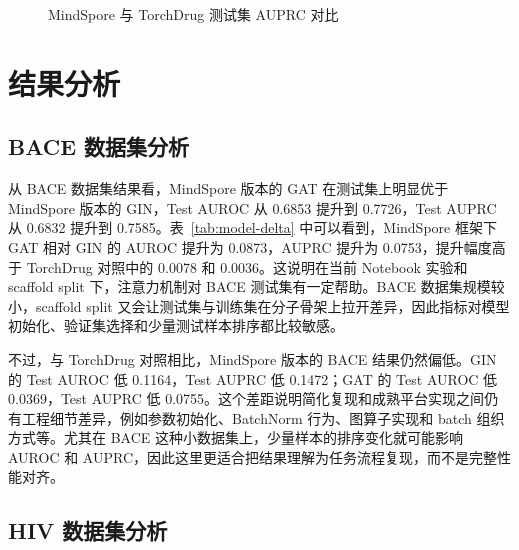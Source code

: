 \documentclass[12pt,hyperref,a4paper,UTF8]{ctexart}
\begin{document}
\begin{figure}[H]
  \centering
  \caption{MindSpore 与 TorchDrug 测试集 AUPRC 对比}
  \label{fig:auprc}
\end{figure}

\section{结果分析}

\subsection{BACE 数据集分析}

从 BACE 数据集结果看，MindSpore 版本的 GAT 在测试集上明显优于 MindSpore 版本的 GIN，Test AUROC 从 0.6853 提升到 0.7726，Test AUPRC 从 0.6832 提升到 0.7585。表~\ref{tab:model-delta} 中可以看到，MindSpore 框架下 GAT 相对 GIN 的 AUROC 提升为 0.0873，AUPRC 提升为 0.0753，提升幅度高于 TorchDrug 对照中的 0.0078 和 0.0036。这说明在当前 Notebook 实验和 scaffold split 下，注意力机制对 BACE 测试集有一定帮助。BACE 数据集规模较小，scaffold split 又会让测试集与训练集在分子骨架上拉开差异，因此指标对模型初始化、验证集选择和少量测试样本排序都比较敏感。

不过，与 TorchDrug 对照相比，MindSpore 版本的 BACE 结果仍然偏低。GIN 的 Test AUROC 低 0.1164，Test AUPRC 低 0.1472；GAT 的 Test AUROC 低 0.0369，Test AUPRC 低 0.0755。这个差距说明简化复现和成熟平台实现之间仍有工程细节差异，例如参数初始化、BatchNorm 行为、图算子实现和 batch 组织方式等。尤其在 BACE 这种小数据集上，少量样本的排序变化就可能影响 AUROC 和 AUPRC，因此这里更适合把结果理解为任务流程复现，而不是完整性能对齐。

\subsection{HIV 数据集分析}
\end{document}
